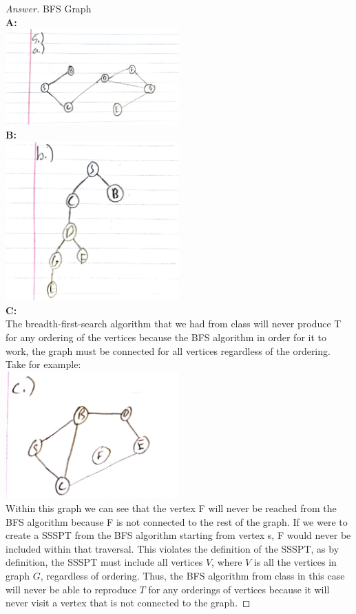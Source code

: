\documentclass[11pt]{article}
\theoremstyle{definition}
\theoremstyle{definition}
\theoremstyle{definition}
\begin{document}
\noindent 
\begin{proof}[Answer] BFS Graph \\
\textbf{A:} \\
\includegraphics[width=0.5\textwidth,angle=360]{CSCI3104_HW1_Q5_A.pdf} \\
\textbf{B:} \\
\includegraphics[width=0.5\textwidth,angle=360]{CSCI3104_Huynh_HW1_Q5B.pdf} \\

\textbf{C:} \\
The breadth-first-search algorithm that we had from class will never produce T for any ordering of the vertices because the BFS algorithm in order for it to work, the graph must be connected for all vertices regardless of the ordering. Take for example: \\
\includegraphics[width=0.5\textwidth,angle=360]{CSCI3104_HW1_Q5C.pdf} \\
Within this graph we can see that the vertex F will never be reached from the BFS algorithm because F is not connected to the rest of the graph. If we were to create a SSSPT from the BFS algorithm starting from vertex s, F would never be included within that traversal. This violates the definition of the SSSPT, as by definition,  the SSSPT must include all vertices  $V$, where $V$ is all the vertices in graph $G$, regardless of ordering. Thus, the BFS algorithm from class in this case will never be able to reproduce $T$ for any orderings of vertices because it will never visit a vertex that is not connected to the graph.



\end{proof}
\end{document}
